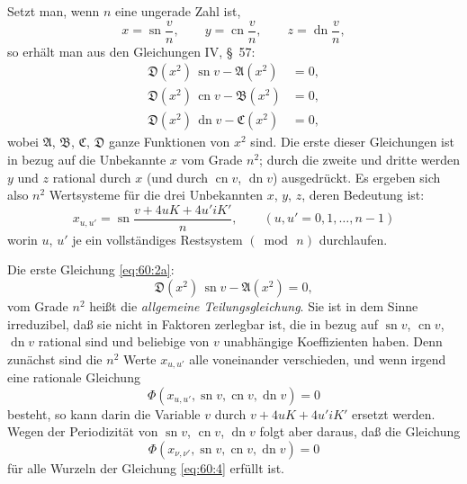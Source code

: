 \documentclass[11pt,a4paper]{article}
\theoremstyle{plain}
\theoremstyle{remark}
\newcommand{\A}{\mathfrak{A}}
\newcommand{\B}{\mathfrak{B}}
\newcommand{\CC}{\mathfrak{C}}
\newcommand{\D}{\mathfrak{D}}
\begin{document}
Setzt man, wenn $n$ eine ungerade Zahl ist,
\begin{equation}\label{eq:60:1}
x = \operatorname{sn}\frac{v}{n},\qquad
y = \operatorname{cn}\frac{v}{n},\qquad
z = \operatorname{dn}\frac{v}{n},
\end{equation}
so erhält man aus den Gleichungen IV, \S~57:
\begin{align}
\D(x^2)\,\operatorname{sn}v - \A(x^2) &= 0, \label{eq:60:2a}\\
\D(x^2)\,\operatorname{cn}v - \B(x^2) &= 0, \label{eq:60:2b}\\
\D(x^2)\,\operatorname{dn}v - \CC(x^2) &= 0, \label{eq:60:2c}
\end{align}
wobei $\A$, $\B$, $\CC$, $\D$ ganze Funktionen von $x^2$ sind.
Die erste dieser Gleichungen ist in bezug auf die Unbekannte
$x$ vom Grade $n^2$; durch die zweite und dritte werden $y$
und $z$ rational durch $x$ (und durch $\operatorname{cn}v$,
$\operatorname{dn}v$) ausgedrückt. Es ergeben sich also $n^2$
Wertsysteme für die drei Unbekannten $x$, $y$, $z$, deren
Bedeutung ist:
\begin{equation}\label{eq:60:3}
x_{u,u'} = \operatorname{sn}\frac{v+4uK+4u'iK'}{n},\qquad
(u,u' = 0,1,\dots,n-1)
\end{equation}
worin $u$, $u'$ je ein vollständiges Restsystem $(\bmod\,n)$
durchlaufen.

Die erste Gleichung \eqref{eq:60:2a}:
\begin{equation}\label{eq:60:4}
\D(x^2)\,\operatorname{sn}v - \A(x^2) = 0,
\end{equation}
vom Grade $n^2$ heißt die \emph{allgemeine Teilungsgleichung}.
Sie ist in dem Sinne irreduzibel, daß sie nicht in Faktoren
zerlegbar ist, die in bezug auf $\operatorname{sn}v$,
$\operatorname{cn}v$, $\operatorname{dn}v$ rational sind und
beliebige von $v$ unabhängige Koeffizienten haben. Denn
zunächst sind die $n^2$ Werte $x_{u,u'}$ alle voneinander
verschieden, und wenn irgend eine rationale Gleichung
\[
\Phi(x_{u,u'}, \operatorname{sn}v, \operatorname{cn}v,
      \operatorname{dn}v) = 0
\]
besteht, so kann darin die Variable $v$ durch
$v+4uK+4u'iK'$ ersetzt werden. Wegen der Periodizität von
$\operatorname{sn}v$, $\operatorname{cn}v$, $\operatorname{dn}v$
folgt aber daraus, daß die Gleichung
\[
\Phi(x_{\nu,\nu'}, \operatorname{sn}v, \operatorname{cn}v,
      \operatorname{dn}v) = 0
\]
für alle Wurzeln der Gleichung \eqref{eq:60:4} erfüllt ist.
\end{document}
